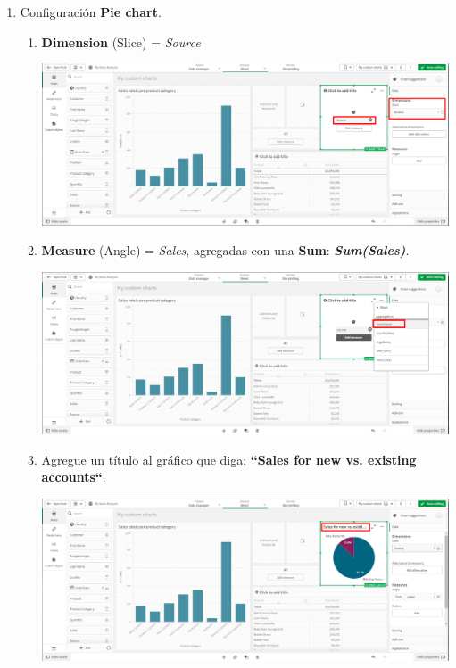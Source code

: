 \documentclass[12pt,letterpaper]{article}
\newcommand\tab[1][1cm]{\hspace*{#1}}
\begin{document}
\begin{enumerate}[\tab 1.]
\begin{enumerate}
\begin{itemize}
\begin{itemize}
\begin{center}
                    \end{center}
                \end{itemize}
            \end{itemize}
        \end{enumerate}
        \item Configuración \textbf{Pie chart}.
        \begin{enumerate}
            \item \textbf{Dimension} (Slice) = \textit{Source}
            \begin{center}
                \includegraphics[width=13cm]{./img/img32.1.png}
            \end{center}
            \item  \textbf{Measure} (Angle) = \textit{Sales}, agregadas con una \textbf{Sum}: \textit{\textbf{Sum(Sales)}}.
            \begin{center}
                \includegraphics[width=13cm]{./img/img32.2.png}
            \end{center}
            \item Agregue un título al gráfico que diga: \textbf{“Sales for new vs. existing accounts“}.
            \begin{center}
                \includegraphics[width=13cm]{./img/img32.3.png}

\end{center}
\end{enumerate}
\end{enumerate}
\end{document}
